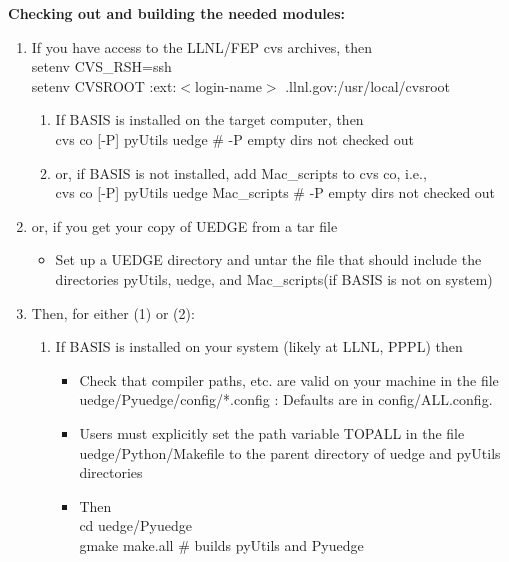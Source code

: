 \documentclass [12pt]{article}
\begin{document}
{\bf Checking out and building the needed modules:}
\begin{enumerate}
       \item If you have access to the LLNL/FEP cvs archives, then \\
       setenv CVS\_RSH=ssh  \\
       setenv CVSROOT :ext:$<$login-name$>$ \@hrothgar.llnl.gov:/usr/local/cvsroot
       \begin{enumerate}
           \item If BASIS is installed on the target computer, then \\
             cvs co [-P] pyUtils uedge \# -P empty dirs not checked out

           \item or, if BASIS is not installed, add Mac\_scripts to cvs co, i.e., \\
            cvs co [-P] pyUtils uedge Mac\_scripts \# -P empty dirs not checked out
      \end{enumerate}

 \item or, if you get your copy of UEDGE from a tar file
  
   \begin{itemize}
      \item Set up a UEDGE directory and untar the file that should include the
         directories pyUtils, uedge, and Mac\_scripts(if BASIS is not on system)
   \end{itemize}
 
  \item Then, for either (1) or (2):
     \begin{enumerate}

       \item If BASIS is installed on your system (likely at LLNL, PPPL) then
   
       \begin{itemize} 
         \item Check that compiler paths, etc. are valid on your machine in the file  \\
           uedge/Pyuedge/config/*.config : Defaults are in config/ALL.config.
         \item Users must explicitly set the path variable {\sf TOPALL} in the file \\
               uedge/Python/Makefile to the parent directory of uedge and pyUtils \\
               directories
          \item 
            Then \\
              cd uedge/Pyuedge \\
              gmake make.all  \# builds pyUtils and Pyuedge
          

\end{itemize}
\end{enumerate}
\end{enumerate}
\end{document}
